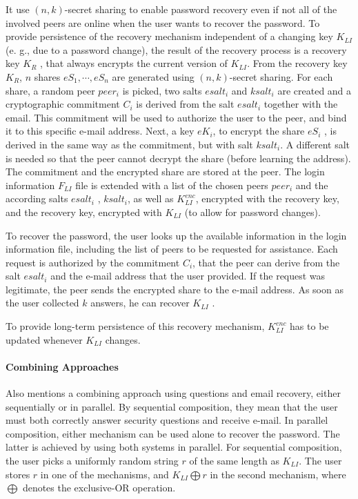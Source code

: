  It use $(n, k)$-secret sharing to enable password recovery even
 if not all of the involved peers are online when the user wants
 to recover the password.
 To provide persistence of the recovery mechanism independent of a changing key $K_{LI}$ (e. g., due to a password change),
 the result of the recovery process is a recovery key $K_R$ ,
 that always encrypts the current version of $K_{LI}$.
  From the recovery key $K_R$, $n$
 shares $eS_1, \cdots, eS_n$ are generated using $(n, k)$-secret sharing.
 For each share, a random peer $peer_i$ is picked, two salts $esalt_i$
 and $ksalt_i$ are created and a cryptographic commitment $C_i$ is
 derived from the salt $esalt_i$ together with the email. This
 commitment will be used to authorize the user to the peer,
 and bind it to this specific e-mail address. Next, a key $eK_i$,
 to encrypt the share $eS_i$ , is derived in the same way as the
 commitment, but with salt $ksalt_i$. A different salt is needed
 so that the peer cannot decrypt the share (before learning the
 address). The commitment and the encrypted share are stored
 at the peer. The login information $F_{LI}$ file is extended with a
 list of the chosen peers $peer_i$ and the according salts $esalt_i$ ,
 $ksalt_i$, as well as $K_{LI}^{enc}$, encrypted with the recovery key, and
 the recovery key, encrypted with $K_{LI}$ (to allow for password
 changes).

 To recover the password, the user looks up the
 available information in the login information file, including
 the list of peers to be requested for assistance. Each request is
 authorized by the commitment $C_i$, that the peer can derive
 from the salt $esalt_i$ and the e-mail address that the user
 provided. If the request was legitimate, the peer
 sends the encrypted share to the e-mail address. As soon as
 the user collected $k$ answers, he can recover $K_{LI}$ .

 To provide long-term persistence of this recovery mechanism, $K_{LI}^{enc}$
 has to be updated whenever $K_{LI}$ changes.
 
 \paragraph{Combining Approaches}
 Also mentions a combining approach using questions and email recovery, either
sequentially or in parallel.
  By sequential composition, they mean
 that the user must both correctly answer security questions and
 receive e-mail. In parallel composition, either
 mechanism can be used alone to recover the password. The
 latter is achieved by using both systems in parallel.
 For sequential composition, the user picks a uniformly
 random string $r$ of the same length as $K_{LI}$. The user stores $r$ in
one of the mechanisms, and $K_{LI} \bigoplus r$ in the second mechanism, where
$\bigoplus $ denotes the exclusive-OR operation.

